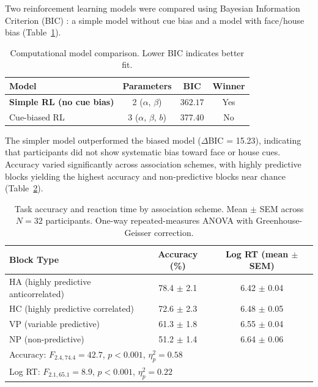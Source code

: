 \documentclass[11pt]{article}
\begin{document}
Two reinforcement learning models were compared using Bayesian Information Criterion (BIC) \citep{bic_schwarz1978}: a simple model without cue bias and a model with face/house bias (Table~\ref{tab:model_comparison}).

\begin{table}[H]
\centering
\caption{Computational model comparison. Lower BIC indicates better fit.}
\label{tab:model_comparison}
\begin{tabular}{lccc}
\toprule
Model & Parameters & BIC & Winner \\
\midrule
\textbf{Simple RL (no cue bias)} & 2 ($\alpha$, $\beta$) & $\mathbf{362.17}$ & Yes \\
Cue-biased RL & 3 ($\alpha$, $\beta$, $b$) & 377.40 & No \\
\bottomrule
\end{tabular}
\end{table}

The simpler model outperformed the biased model ($\Delta$BIC = 15.23), indicating that participants did not show systematic bias toward face or house cues. Accuracy varied significantly across association schemes, with highly predictive blocks yielding the highest accuracy and non-predictive blocks near chance (Table~\ref{tab:accuracy}).

\begin{table}[H]
\centering
\caption{Task accuracy and reaction time by association scheme. Mean $\pm$ SEM across $N = 32$ participants. One-way repeated-measures ANOVA with Greenhouse-Geisser correction.}
\label{tab:accuracy}
\begin{tabular}{lcc}
\toprule
Block Type & Accuracy (\%) & Log RT (mean $\pm$ SEM) \\
\midrule
HA (highly predictive anticorrelated) & 78.4 $\pm$ 2.1 & 6.42 $\pm$ 0.04 \\
HC (highly predictive correlated) & 72.6 $\pm$ 2.3 & 6.48 $\pm$ 0.05 \\
VP (variable predictive) & 61.3 $\pm$ 1.8 & 6.55 $\pm$ 0.04 \\
NP (non-predictive) & 51.2 $\pm$ 1.4 & 6.64 $\pm$ 0.06 \\
\midrule
\multicolumn{3}{l}{Accuracy: $F_{2.4,74.4} = 42.7$, $p < 0.001$, $\eta_p^2 = 0.58$} \\
\multicolumn{3}{l}{Log RT: $F_{2.1,65.1} = 8.9$, $p < 0.001$, $\eta_p^2 = 0.22$} \\
\bottomrule
\end{tabular}
\end{table}
\end{document}
